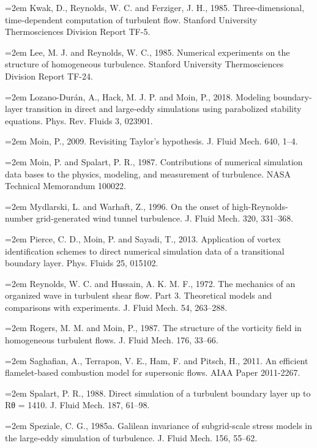\documentclass[12pt,a4paper,openany,fontset=none]{ctexbook}
\begin{document}
\par\hangindent=2em Kwak, D., Reynolds, W. C. and Ferziger, J. H., 1985. Three-dimensional, time-dependent computation of turbulent flow. Stanford University Thermosciences Division Report TF-5.
\par\hangindent=2em Lee, M. J. and Reynolds, W. C., 1985. Numerical experiments on the structure of homogeneous turbulence. Stanford University Thermosciences Division Report TF-24.
\par\hangindent=2em Lozano-Durán, A., Hack, M. J. P. and Moin, P., 2018. Modeling boundary-layer transition in direct and large-eddy simulations using parabolized stability equations. Phys. Rev. Fluids 3, 023901.
\par\hangindent=2em Moin, P., 2009. Revisiting Taylor’s hypothesis. J. Fluid Mech. 640, 1–4.
\par\hangindent=2em Moin, P. and Spalart, P. R., 1987. Contributions of numerical simulation data bases to the physics, modeling, and measurement of turbulence. NASA Technical Memorandum 100022.
\par\hangindent=2em Mydlarski, L. and Warhaft, Z., 1996. On the onset of high-Reynolds-number grid-generated wind tunnel turbulence. J. Fluid Mech. 320, 331–368.
\par\hangindent=2em Pierce, C. D., Moin, P. and Sayadi, T., 2013. Application of vortex identification schemes to direct numerical simulation data of a transitional boundary layer. Phys. Fluids 25, 015102.
\par\hangindent=2em Reynolds, W. C. and Hussain, A. K. M. F., 1972. The mechanics of an organized wave in turbulent shear flow. Part 3. Theoretical models and comparisons with experiments. J. Fluid Mech. 54, 263–288.
\par\hangindent=2em Rogers, M. M. and Moin, P., 1987. The structure of the vorticity field in homogeneous turbulent flows. J. Fluid Mech. 176, 33–66.
\par\hangindent=2em Saghafian, A., Terrapon, V. E., Ham, F. and Pitsch, H., 2011. An efficient flamelet-based combustion model for supersonic flows. AIAA Paper 2011-2267.
\par\hangindent=2em Spalart, P. R., 1988. Direct simulation of a turbulent boundary layer up to Rθ = 1410. J. Fluid Mech. 187, 61–98.
\par\hangindent=2em Speziale, C. G., 1985a. Galilean invariance of subgrid-scale stress models in the large-eddy simulation of turbulence. J. Fluid Mech. 156, 55–62.
\end{document}
